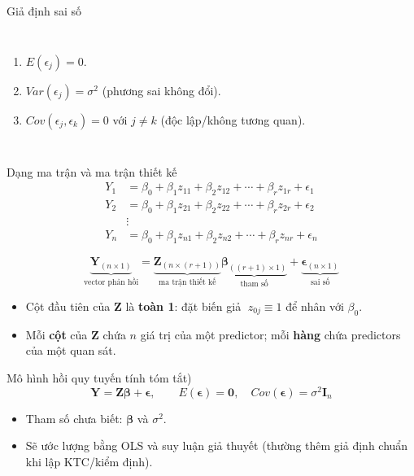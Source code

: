 \begin{frame}{Giả định sai số }
\begin{columns}[T]
\begin{enumerate}
  \item $E(\epsilon_j)=0$.
  \item $Var(\epsilon_j)=\sigma^2$ (phương sai không đổi).
  \item $Cov(\epsilon_j,\epsilon_k)=0$ với $j\neq k$ (độc lập/không tương quan).
\end{enumerate}

\end{columns}
\end{frame}

\begin{frame}{Dạng ma trận và ma trận thiết kế}
\begin{align*}
Y_1 &= \beta_0 + \beta_1 z_{11} + \beta_2 z_{12} + \cdots + \beta_r z_{1r} + \epsilon_1 \\
Y_2 &= \beta_0 + \beta_1 z_{21} + \beta_2 z_{22} + \cdots + \beta_r z_{2r} + \epsilon_2 \\
&\vdots \\
Y_n &= \beta_0 + \beta_1 z_{n1} + \beta_2 z_{n2} + \cdots + \beta_r z_{nr} + \epsilon_n
\end{align*}

\[

\underbrace{\mathbf Y_{(n\times 1)}}_{\text{vector phản hồi}}
= 
\underbrace{\mathbf Z_{(n\times (r+1))}}_{\text{ma trận thiết kế}}
\underbrace{\boldsymbol{\beta}_{((r+1)\times 1)}}_{\text{tham số}}
+
\underbrace{\mathbf \epsilon_{(n\times 1)}}_{\text{sai số}}
\]
\begin{itemize}
  \item Cột đầu tiên của $\mathbf Z$ là \textbf{toàn 1}: đặt biến giả $\;z_{0j}\equiv 1$ để nhân với $\beta_0$.
  \item Mỗi \textbf{cột} của $\mathbf Z$ chứa $n$ giá trị của một predictor; mỗi \textbf{hàng} chứa predictors của một quan sát.
\end{itemize}
\end{frame}

\begin{frame}{Mô hình hồi quy tuyến tính tóm tắt)}
\[
\mathbf Y=\mathbf Z\boldsymbol{\beta}+\mathbf \epsilon,\qquad
E(\mathbf \epsilon)=\mathbf 0,\quad Cov(\mathbf \epsilon)=\sigma^2 \mathbf I_n
\]
\begin{itemize}
  \item Tham số chưa biết: $\boldsymbol{\beta}$ và $\sigma^2$.
  \item Sẽ ước lượng bằng OLS và suy luận giả thuyết (thường thêm giả định chuẩn khi lập KTC/kiểm định).
\end{itemize}
\end{frame}

